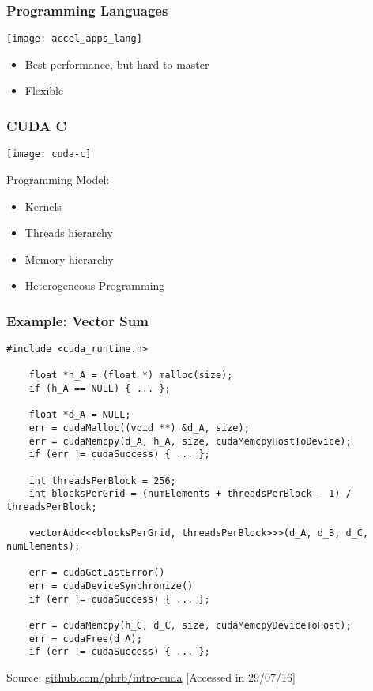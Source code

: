 \documentclass[10pt, compress]{beamer}
\begin{document}
\begin{frame}
    \frametitle{Programming Languages}
    \begin{center}
        \texttt{[image: accel\_apps\_lang]}
    \end{center}

    \begin{itemize}
        \item Best performance, but hard to master
        \item Flexible
    \end{itemize}
\end{frame}

\begin{frame}
    \frametitle{CUDA C}
    \begin{center}
        \texttt{[image: cuda-c]}
    \end{center}

    Programming Model:

    \begin{itemize}
        \item \alert{Kernels}
        \item \alert{Threads} hierarchy
        \item \alert{Memory} hierarchy
        \item \alert{Heterogeneous} Programming
    \end{itemize}
\end{frame}

\begin{frame}[fragile]
    \frametitle{Example: Vector Sum}
    \begin{lstlisting}[basicstyle=\ttfamily\scriptsize]
    #include <cuda_runtime.h>

    float *h_A = (float *) malloc(size);
    if (h_A == NULL) { ... };

    float *d_A = NULL;
    err = cudaMalloc((void **) &d_A, size);
    err = cudaMemcpy(d_A, h_A, size, cudaMemcpyHostToDevice);
    if (err != cudaSuccess) { ... };

    int threadsPerBlock = 256;
    int blocksPerGrid = (numElements + threadsPerBlock - 1) / threadsPerBlock;

    vectorAdd<<<blocksPerGrid, threadsPerBlock>>>(d_A, d_B, d_C, numElements);

    err = cudaGetLastError()
    err = cudaDeviceSynchronize()
    if (err != cudaSuccess) { ... };

    err = cudaMemcpy(h_C, d_C, size, cudaMemcpyDeviceToHost);
    err = cudaFree(d_A);
    if (err != cudaSuccess) { ... };
    \end{lstlisting}

    \vfill

    \begin{center}
        \tiny{Source: \url{github.com/phrb/intro-cuda} [Accessed in 29/07/16]}
    \end{center}
\end{frame}
\end{document}
